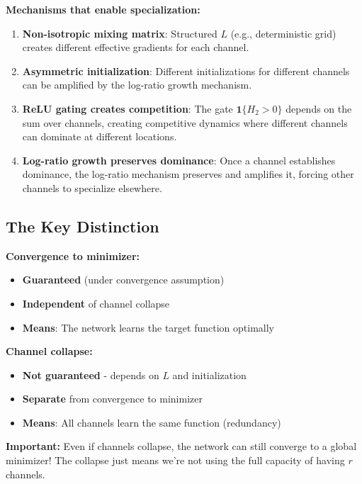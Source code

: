 \textbf{Mechanisms that enable specialization:}

\begin{enumerate}
\item \textbf{Non-isotropic mixing matrix}: Structured $L$ (e.g., deterministic grid) creates different effective gradients for each channel.

\item \textbf{Asymmetric initialization}: Different initializations for different channels can be amplified by the log-ratio growth mechanism.

\item \textbf{ReLU gating creates competition}: The gate $\mathbf{1}\{H_2 > 0\}$ depends on the sum over channels, creating competitive dynamics where different channels can dominate at different locations.

\item \textbf{Log-ratio growth preserves dominance}: Once a channel establishes dominance, the log-ratio mechanism preserves and amplifies it, forcing other channels to specialize elsewhere.
\end{enumerate}

\subsection{The Key Distinction}

\textbf{Convergence to minimizer:}
\begin{itemize}
\item \textbf{Guaranteed} (under convergence assumption)
\item \textbf{Independent} of channel collapse
\item \textbf{Means}: The network learns the target function optimally
\end{itemize}

\textbf{Channel collapse:}
\begin{itemize}
\item \textbf{Not guaranteed} - depends on $L$ and initialization
\item \textbf{Separate} from convergence to minimizer
\item \textbf{Means}: All channels learn the same function (redundancy)
\end{itemize}

\textbf{Important:} Even if channels collapse, the network can still converge to a global minimizer! The collapse just means we're not using the full capacity of having $r$ channels.

